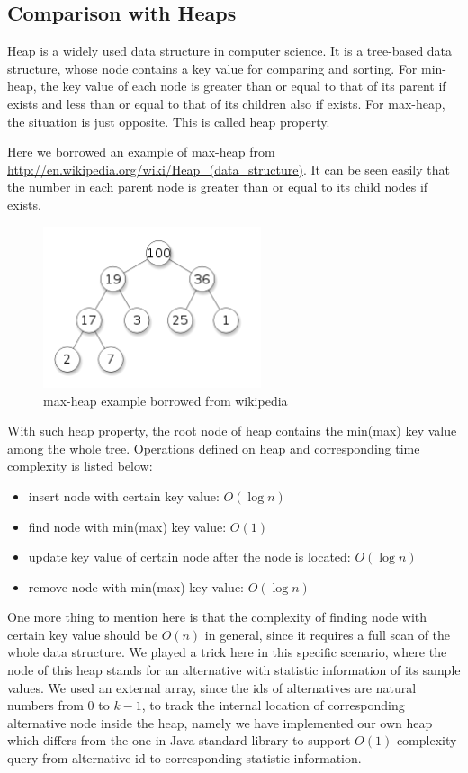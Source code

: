 \documentclass[12pt,a4paper]{report}
\begin{document}
\subsection{Comparison with Heaps}

Heap is a widely used data structure in computer science. It is a tree-based data structure, whose node contains a key value for comparing and sorting. For min-heap, the key value of each node is greater than or equal to that of its parent if exists and less than or equal to that of its children also if exists. For max-heap, the situation is just opposite. This is called heap property.

Here we borrowed an example of max-heap from \url{http://en.wikipedia.org/wiki/Heap_(data_structure)}. It can be seen easily that the number in each parent node is greater than or equal to its child nodes if exists.

\begin{figure}[ht]
\centering
\includegraphics[width=64mm]{heap.png}
\caption{max-heap example borrowed from wikipedia}
\end{figure}

With such heap property, the root node of heap contains the min(max) key value among the whole tree. Operations defined on heap and corresponding time complexity is listed below:

\begin{itemize}
\item insert node with certain key value: $O(\log n)$
\item find node with min(max) key value: $O(1)$
\item update key value of certain node after the node is located: $O(\log n)$
\item remove node with min(max) key value: $O(\log n)$
\end{itemize}

One more thing to mention here is that the complexity of finding node with certain key value should be $O(n)$ in general, since it requires a full scan of the whole data structure. We played a trick here in this specific scenario, where the node of this heap stands for an alternative with statistic information of its sample values. We used an external array, since the ids of alternatives are natural numbers from $0$ to $k - 1$, to track the internal location of corresponding alternative node inside the heap, namely we have implemented our own heap which differs from the one in Java standard library to support $O(1)$ complexity query from alternative id to corresponding statistic information.
\end{document}
